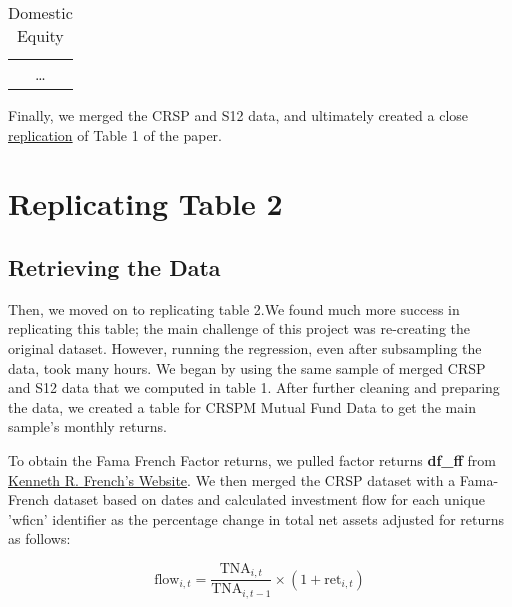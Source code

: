 \documentclass{article}
\begin{document}
\begin{table}

\centering
\captionsetup{labelformat=empty, font=bf}
\caption{Domestic Equity}


\vspace{5pt} %

\begin{tabular}{c} %

\multicolumn{1}{c}{\ldots} \\ %
\end{tabular}

\end{table} 
 
Finally, we merged the CRSP and S12 data, and ultimately created
a close \hyperref[tab:table_complete]{replication} of Table 1 of the paper.



\section{Replicating Table 2}

\subsection{Retrieving the Data}
Then, we moved on to replicating table 2.We found much more success in replicating this table; the main 
challenge of this project was re-creating the original dataset. However, running the regression, even after subsampling
the data, took many hours. We began by using the same sample of 
merged CRSP and S12 data that we computed in table 1. After further cleaning and preparing the data, 
we created a table for CRSPM Mutual Fund Data to get the main sample's monthly returns. 

% 

To obtain the Fama French Factor returns, we pulled factor returns \textbf{df\_ff} from 
\href{http://mba.tuck.dartmouth.edu/pages/faculty/ken.french/index.html}{Kenneth 
R. French's Website}. We then merged the CRSP dataset with a Fama-French dataset based on
dates and calculated investment flow for each unique 'wficn' identifier as the 
percentage change in total net assets adjusted for returns as follows: 

$$
\text{flow}_{i,t} = \frac{\text{TNA}_{i,t}}{\text{TNA}_{i,t-1}} \times (1 + \text{ret}_{i,t})
$$
\end{document}
